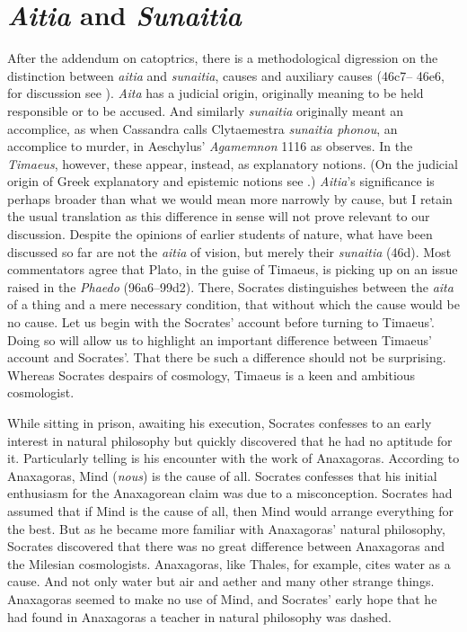 
\section{\emph{Aitia} and \emph{Sunaitia}} %
\label{sec:_emph_aitia_and_emph_sunaitia}

After the addendum on catoptrics, there is a methodological digression on the distinction between \emph{aitia} and \emph{sunaitia}, causes and auxiliary causes (46c7–
46e6, for discussion see \citealt{Strange:1985aa}). \emph{Aita} has a judicial origin, originally meaning to be held responsible or to be accused. And similarly \emph{sunaitia} originally meant an accomplice, as when Cassandra calls Clytaemestra \emph{sunaitia phonou}, an accomplice to murder, in Aeschylus' \emph{Agamemnon} 1116 as \citet[291]{Taylor:1928qb} observes. In the \emph{Timaeus}, however, these appear, instead, as explanatory notions. (On the judicial origin of Greek explanatory and epistemic notions see \citealt[chapter 4]{Lloyd:1979lc}.) \emph{Aitia}'s significance is perhaps broader than what we would mean more narrowly by cause, but I retain the usual translation as this difference in sense will not prove relevant to our discussion. Despite the opinions of earlier students of nature, what have been discussed so far are not the \emph{aitia} of vision, but merely their \emph{sunaitia} (46d). Most commentators agree that Plato, in the guise of Timaeus, is picking up on an issue raised in the \emph{Phaedo} (96a6--99d2). There, Socrates distinguishes between the \emph{aita} of a thing and a mere necessary condition, that without which the cause would be no cause. Let us begin with the Socrates' account before turning to Timaeus'. Doing so will allow us to highlight an important difference between Timaeus' account and Socrates'. That there be such a difference should not be surprising. Whereas Socrates despairs of cosmology, Timaeus is a keen and ambitious cosmologist.

While sitting in prison, awaiting his execution, Socrates confesses to an early interest in natural philosophy but quickly discovered that he had no aptitude for it. Particularly telling is his encounter with the work of Anaxagoras. According to Anaxagoras, Mind (\emph{nous}) is the cause of all. Socrates confesses that his initial enthusiasm for the Anaxagorean claim was due to a misconception. Socrates had assumed that if Mind is the cause of all, then Mind would arrange everything for the best. But as he became more familiar with Anaxagoras' natural philosophy, Socrates discovered that there was no great difference between Anaxagoras and the Milesian cosmologists. Anaxagoras, like Thales, for example, cites water as a cause. And not only water but air and aether and many other strange things. Anaxagoras seemed to make no use of Mind, and Socrates' early hope that he had found in Anaxagoras a teacher in natural philosophy was dashed. 

